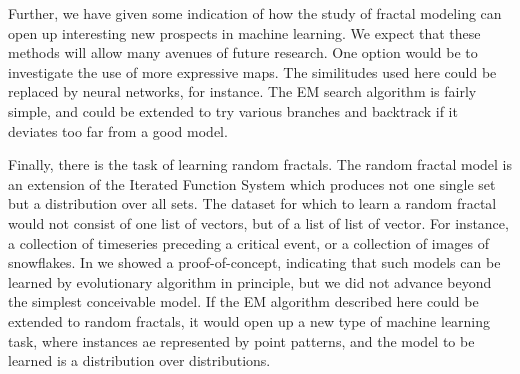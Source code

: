 \documentclass[10pt]{article}
\theoremstyle{definition}
\begin{document}
Further, we have given some indication of how the study of fractal modeling can open up interesting new prospects in machine learning. We expect that these methods will allow many avenues of future research. One option would be to investigate the use of more expressive maps. The similitudes used here could be replaced by neural networks, for instance. The EM search algorithm is fairly simple, and could be extended to try various branches and backtrack if it deviates too far from a good model.

Finally, there is the task of learning random fractals. The random fractal model is an extension of the Iterated Function System which produces not one single set but a distribution over all sets. The dataset for which to learn a random fractal would not consist of one list of vectors, but of a list of list of vector. For instance, a collection of timeseries preceding a critical event, or a collection of images of snowflakes. In \cite{bloem2010fractal} we showed a proof-of-concept, indicating that such models can be learned by evolutionary algorithm in principle, but we did not advance beyond the simplest conceivable model. If the EM algorithm described here could be extended to random fractals, it would open up a new type of machine learning task, where instances ae represented by point patterns, and the model to be learned is a distribution over distributions.  



\end{document}
